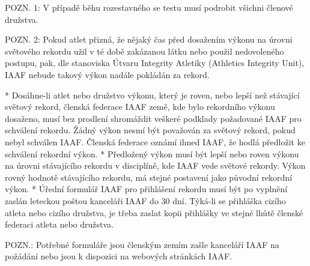 POZN. 1: V případě běhu rozestavného se testu musí podrobit všichni členové družstva.

POZN. 2: Pokud atlet přizná, že nějaký čas před dosažením výkonu na úrovni světového rekordu užil v té době zakázanou látku nebo použil nedovoleného postupu, pak, dle stanoviska Útvaru Integrity Atletiky (Athletics Integrity Unit), IAAF nebude takový výkon nadále pokládán za rekord.

* Dosáhne-li atlet nebo družstvo výkonu, který je roven, nebo lepší než stávající světový rekord, členská federace IAAF země, kde bylo rekordního výkonu dosaženo, musí bez prodlení shromáždit veškeré podklady požadované IAAF pro schválení rekordu. Žádný výkon nesmí být považován za světový rekord, pokud nebyl schválen IAAF. Členská federace oznámí ihned IAAF, že hodlá předložit ke schválení rekordní výkon.
* Předložený výkon musí být lepší nebo roven výkonu na úrovni stávajícího rekordu v disciplíně, kde IAAF vede světové rekordy. Výkon rovný hodnotě stávajícího rekordu, má stejné postavení jako původní rekordní výkon.
* Úřední formulář IAAF pro přihlášení rekordu musí být po vyplnění zaslán leteckou poštou kanceláři IAAF do 30 dní. Týká-li se přihláška cizího atleta nebo cizího družstva, je třeba zaslat kopii přihlášky ve stejné lhůtě členské federaci atleta nebo družstva.

POZN.: Potřebné formuláře jsou členským zemím zašle kanceláří IAAF na požádání nebo jsou k dispozici na webových stránkách IAAF.

